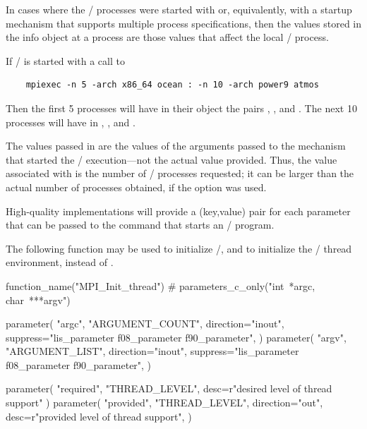 In cases where the \MPI/ processes were started with
 or, equivalently, with  a
startup mechanism that supports multiple process specifications, then
the values stored in the info object  at a
process are those values that affect the local \MPI/ process.

\begin{example}
%
If \MPI/ is started with a call to
\begin{verbatim}
    mpiexec -n 5 -arch x86_64 ocean : -n 10 -arch power9 atmos
\end{verbatim}
Then the first 5 processes will have in their
 object the pairs ,
,
and . The next 10 processes will have  in
 ,
,
and .
\end{example}

\begin{users}
The values passed in  are the values of the
arguments passed to the mechanism that started the \MPI/ execution---not
the actual value provided. Thus, the value associated with
 is the number of \MPI/ processes requested; it can
be larger than the actual number of processes obtained, if the
 option was used.
\end{users}

\begin{implementors}
High-quality implementations will provide a (key,value) pair for each
parameter that can be passed to the command that starts an \MPI/
program.
\end{implementors}

\label{sec:ei-threads-initialization}

The following function may be used to initialize \MPI/, and to initialize
the \MPI/ thread environment, instead of .

\begin{mpi-binding}
    function_name("MPI_Init_thread")
    # parameters_c_only("int~*argc, char~***argv")

    parameter(
        "argc",
        "ARGUMENT_COUNT",
        direction="inout",
        suppress="lis_parameter f08_parameter f90_parameter",
    )
    parameter(
        "argv",
        "ARGUMENT_LIST",
        direction="inout",
        suppress="lis_parameter f08_parameter f90_parameter",
    )

    parameter(
        "required", "THREAD_LEVEL", desc=r"desired level of thread support"
    )
    parameter(
        "provided",
        "THREAD_LEVEL",
        direction="out",
        desc=r"provided level of thread support",
    )
\end{mpi-binding}

